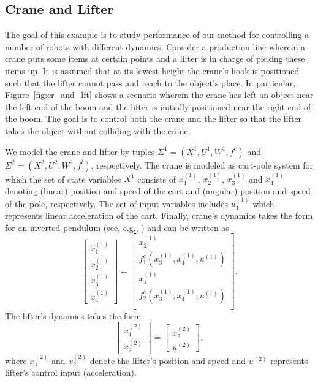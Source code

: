 \subsection{Crane and Lifter}
The goal of this example is to study performance of our method for controlling a number of robots with different dynamics. Consider a production line wherein a crane puts some items at certain points and a lifter is in charge of picking these items up. It is assumed that at its lowest height the crane's hook is positioned such that the lifter cannot pass and reach to the object's place. In particular, Figure~\ref{fig:cr_and_lft} shows a scenario wherein the crane has left an object near the left end of the boom and the lifter is initially positioned near the right end of the boom. The goal is to control both the crane and the lifter so that the lifter takes the object without colliding with the crane. 

We model the crane and lifter by tuples $\Sigma^1=(X^1,U^1,W^1,f^c)$ and $\Sigma^2=(X^2,U^2,W^2,f^l)$, respectively.  The crane is modeled as cart-pole system for which the set of state variables $X^1$ consists of $x_1^{(1)}$, $x_2^{(1)}$, $x_3^{(1)}$ and $x_4^{(1)}$ denoting (linear) position and speed of the cart and (angular) position and speed of the pole, respectively. The set of input variables includes $u_1^{(1)}$ which represents linear acceleration of the cart. Finally, crane's dynamics takes the form for an inverted pendulum (see, e.g., \cite{barto1983neuronlike}) and can be written as
\[\begin{bmatrix}
	\dot{x}_1^{(1)}\\
	\dot{x}_2^{(1)}\\
	\dot{x}_3^{(1)}\\
	\dot{x}_4^{(1)}
\end{bmatrix}=\begin{bmatrix}
	x_2^{(1)}\\
	f^c_1(x_3^{(1)},x_4^{(1)},u^{(1)})\\
	x_4^{(1)}\\
	f^c_2(x_3^{(1)},x_4^{(1)},u^{(1)})\\
\end{bmatrix}.\]
The lifter's dynamics takes the form
\[\begin{bmatrix}
\dot{x}_1^{(2)}\\ \dot{x}^{(2)}_2 \end{bmatrix}=\begin{bmatrix} x^{(2)}_2\\ u^{(2)} \end{bmatrix},
\]
where $x_1^{(2)}$ and $x_2^{(2)}$ denote the lifter's position and speed and $u^{(2)}$ represents lifter's control input (acceleration).

